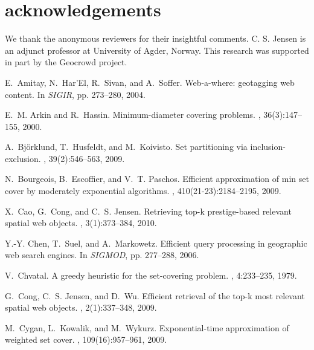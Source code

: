 \documentclass{sig-alternate}
\begin{document}
\vspace{-1ex}
\section{acknowledgements}
We thank the anonymous reviewers for their insightful comments.
C. S. Jensen is an adjunct professor at University of Agder, Norway.
This research was supported in part by the Geocrowd project.

%


% 

\begin{thebibliography}{10}

\begin{small}
E.~Amitay, N.~Har'El, R.~Sivan, and A.~Soffer.
\newblock Web-a-where: geotagging web content.
\newblock In {\em SIGIR}, pp. 273--280, 2004.

E.~M. Arkin and R.~Hassin.
\newblock Minimum-diameter covering problems.
, 36(3):147--155, 2000.

A.~Bj\"{o}rklund, T.~Husfeldt, and M.~Koivisto.
\newblock Set partitioning via inclusion-exclusion.
, 39(2):546--563, 2009.

N.~Bourgeois, B.~Escoffier, and V.~T. Paschos.
\newblock Efficient approximation of min set cover by moderately exponential
  algorithms.
, 410(21-23):2184--2195, 2009.

X.~Cao, G.~Cong, and C.~S. Jensen.
\newblock Retrieving top-k prestige-based relevant spatial web objects.
, 3(1):373--384, 2010.

Y.-Y. Chen, T.~Suel, and A.~Markowetz.
\newblock Efficient query processing in geographic web search engines.
\newblock In {\em SIGMOD}, pp. 277--288, 2006.

V.~Chvatal.
\newblock A greedy heuristic for the set-covering problem.
, 4:233--235, 1979.

G.~Cong, C.~S. Jensen, and D.~Wu.
\newblock Efficient retrieval of the top-k most relevant spatial web objects.
, 2(1):337--348, 2009.

M.~Cygan, L.~Kowalik, and M.~Wykurz.
\newblock Exponential-time approximation of weighted set cover.
, 109(16):957--961, 2009.


\end{small}
\end{thebibliography}
\end{document}
